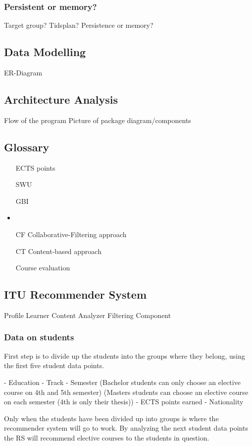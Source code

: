 \subsubsection{Persistent or memory?}

Target group?
Tidsplan?
Persistence or memory?
\subsection{Data Modelling}
ER-Diagram

\subsection{Architecture Analysis}
Flow of the program
Picture of package diagram/components

\subsection{Glossary}
\begin{itemize}
	\item[ECTS points] 
	\item[SWU]
	\item[GBI]
	\item {}
	\item[CF] Collaborative-Filtering approach
	\item[CT] Content-based approach
	\item[Course evaluation]
\end{itemize}
\subsection{ITU Recommender System}
Profile Learner
Content Analyzer
Filtering Component


\subsubsection{Data on students}
First step is to divide up the students into the groups where they belong, using the first five student data points.

- Education
- Track
- Semester (Bachelor students can only choose an elective course on 4th and 5th semester) (Masters students can choose an elective course on each semester (4th is only their thesis))
- ECTS points earned
- Nationality

Only when the students have been divided up into groups is where the recommender system will go to work. By analyzing the next student data points the RS will recommend elective courses to the students in question.

